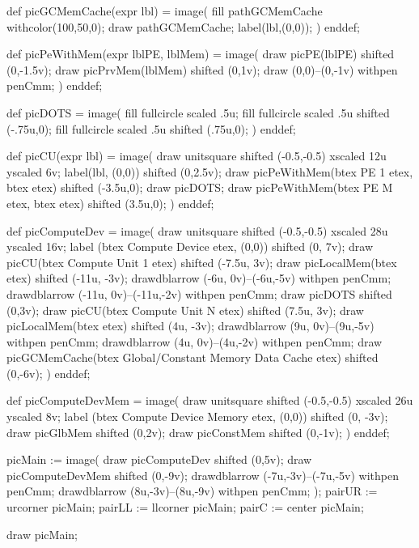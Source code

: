 def picGCMemCache(expr lbl) =
image(
fill pathGCMemCache withcolor(100,50,0);
draw pathGCMemCache;
label(lbl,(0,0));
)
enddef;

def picPeWithMem(expr lblPE, lblMem) =
image(
draw picPE(lblPE) shifted (0,-1.5v);
draw picPrvMem(lblMem) shifted (0,1v);
draw (0,0)--(0,-1v) withpen penCmm;
)
enddef;

def picDOTS =
image(
fill fullcircle scaled .5u;
fill fullcircle scaled .5u shifted (-.75u,0);
fill fullcircle scaled .5u shifted (.75u,0);
)
enddef;

def picCU(expr lbl) =
image(
	draw unitsquare shifted (-0.5,-0.5) xscaled 12u yscaled 6v;
	label(lbl, (0,0)) shifted (0,2.5v);
	draw picPeWithMem(btex PE 1 etex, btex  etex) shifted (-3.5u,0);
	draw picDOTS;
	draw picPeWithMem(btex PE M etex, btex  etex) shifted (3.5u,0);
)
enddef;

def picComputeDev =
image(
	draw unitsquare shifted (-0.5,-0.5) xscaled 28u yscaled 16v;
	label (btex Compute Device etex, (0,0)) shifted (0, 7v);
	draw picCU(btex Compute Unit 1 etex) shifted (-7.5u, 3v);
	draw picLocalMem(btex  etex) shifted (-11u, -3v);
	drawdblarrow (-6u, 0v)--(-6u,-5v) withpen penCmm;
	drawdblarrow (-11u, 0v)--(-11u,-2v) withpen penCmm;
	draw picDOTS shifted (0,3v);
	draw picCU(btex Compute Unit N etex) shifted (7.5u, 3v);
	draw picLocalMem(btex  etex) shifted (4u, -3v);
	drawdblarrow (9u, 0v)--(9u,-5v) withpen penCmm;
	drawdblarrow (4u, 0v)--(4u,-2v) withpen penCmm;
	draw picGCMemCache(btex Global/Constant Memory Data Cache etex) shifted (0,-6v);
)
enddef;

def picComputeDevMem =
image(
	draw unitsquare shifted (-0.5,-0.5) xscaled 26u yscaled 8v;
	label (btex Compute Device Memory etex, (0,0)) shifted (0, -3v);
	draw picGlbMem shifted (0,2v);
	draw picConstMem shifted (0,-1v);
)
enddef;

picMain := image(
	draw picComputeDev shifted (0,5v);
	draw picComputeDevMem shifted (0,-9v);
	drawdblarrow (-7u,-3v)--(-7u,-5v) withpen penCmm;
	drawdblarrow (8u,-3v)--(8u,-9v) withpen penCmm;
);
pairUR := urcorner picMain;
pairLL := llcorner picMain;
pairC := center picMain;


draw picMain;
\stopreusableMPgraphic
